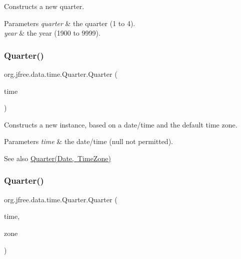 Constructs a new quarter.


\begin{DoxyParams}{Parameters}
{\em quarter} & the quarter (1 to 4). \\
\hline
{\em year} & the year (1900 to 9999). \\
\hline
\end{DoxyParams}
\mbox{\label{classorg_1_1jfree_1_1data_1_1time_1_1_quarter_a8af8a0161d0caf630494f9772f592ec6}} 
\subsubsection{\texorpdfstring{Quarter()}{Quarter()}\hspace{0.1cm}{\footnotesize\ttfamily [4/6]}}
{\footnotesize\ttfamily org.\+jfree.\+data.\+time.\+Quarter.\+Quarter (\begin{DoxyParamCaption}\item[{Date}]{time }\end{DoxyParamCaption})}

Constructs a new instance, based on a date/time and the default time zone.


\begin{DoxyParams}{Parameters}
{\em time} & the date/time ({\ttfamily null} not permitted).\\
\hline
\end{DoxyParams}
\begin{DoxySeeAlso}{See also}
\mbox{\hyperlink{classorg_1_1jfree_1_1data_1_1time_1_1_quarter_a75d24338919f6eb6b2a1dd893e4e1f9d}{Quarter(\+Date, Time\+Zone)}} 
\end{DoxySeeAlso}
\mbox{\label{classorg_1_1jfree_1_1data_1_1time_1_1_quarter_a75d24338919f6eb6b2a1dd893e4e1f9d}} 
\subsubsection{\texorpdfstring{Quarter()}{Quarter()}\hspace{0.1cm}{\footnotesize\ttfamily [5/6]}}
{\footnotesize\ttfamily org.\+jfree.\+data.\+time.\+Quarter.\+Quarter (\begin{DoxyParamCaption}\item[{Date}]{time,  }\item[{Time\+Zone}]{zone }\end{DoxyParamCaption})}

